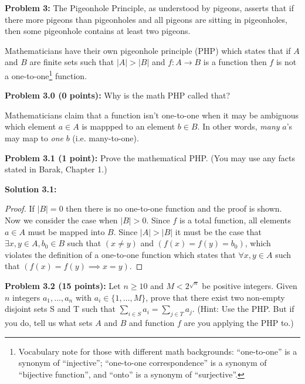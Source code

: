 \documentclass[11pt]{article}
\begin{document}
\newpage

\textbf{Problem 3:} The Pigeonhole Principle, as understood by pigeons, asserts that if there more pigeons than pigeonholes and all pigeons are sitting in pigeonholes, then some pigeonhole contains at least two pigeons.

Mathematicians have their own pigeonhole principle (PHP) which states that if $A$ and $B$ are finite sets such that $|A| > |B|$ and $f:A\to B$ is a function then $f$ is not a one-to-one\footnote{Vocabulary note for those with different math backgrounds: ``one-to-one'' is a synonym of ``injective''; ``one-to-one correspondence'' is a synonym of ``bijective function'', and ``onto'' is a synonym of ``surjective''.} function.

\textbf{Problem 3.0 (0 points):} Why is the math PHP called that?

Mathematicians claim that a function isn't one-to-one when it may be ambiguous which element $a \in A$ is mappped to an element $b \in B$. In other words, \textit{many} $a$'s may map to \textit{one} $b$ (i.e. many-to-one).

\textbf{Problem 3.1 (1 point):} Prove the mathematical PHP. (You may use any facts stated in Barak, Chapter 1.)

\textbf{Solution 3.1:} %
\begin{proof}
	If $|B| = 0$ then there is no one-to-one function and the proof is shown. Now we consider the case when $|B| > 0$.
	Since $f$ is a total function, all elements $a \in A$ must be mapped into $B$. Since $|A| > |B|$ it must be the case that $\exists x,y \in A, b_0 \in B$ such that $(x \neq y)$ and $(f(x) = f(y) = b_0)$, which violates the definition of a one-to-one function which states that $\forall x,y \in A$ such that $(f(x) = f(y) \implies x= y)$.
\end{proof}

\textbf{Problem 3.2 (15 points):}
Let $n \ge 10$ and $M < 2^{\sqrt{n}}$ be positive integers. Given $n$ integers $a_1,\ldots,  a_n$ with $a_i \in \{1, \ldots, M\}$, prove that there exist two non-empty disjoint sets S and T such that $\sum_{i \in S} a_i = \sum_{j \in T} a_j$. (Hint: Use the PHP. But if you do, tell us what sets $A$ and $B$ and function $f$ are you applying the PHP to.)
\end{document}
